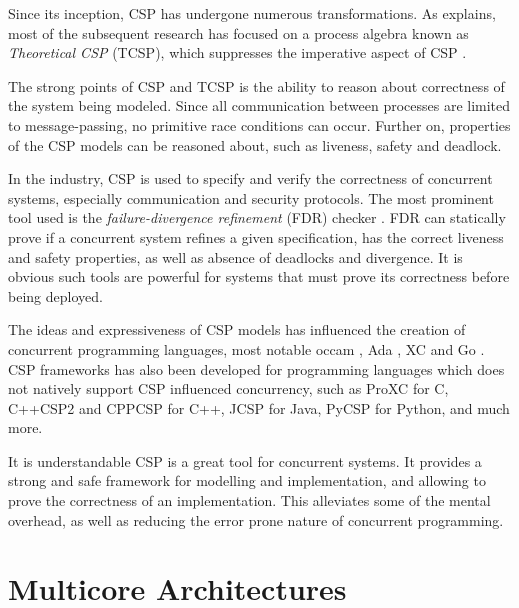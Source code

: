 Since its inception, CSP has undergone numerous transformations. As \citet{abdallah2005communicating} explains, most of the subsequent research has focused on a process algebra known as \textit{Theoretical CSP} (TCSP), which suppresses the imperative aspect of CSP \citep{brookes1984theory}. 

The strong points of CSP and TCSP is the ability to reason about correctness of the system being modeled. Since all communication between processes are limited to message\hyp{}passing, no primitive race conditions can occur. Further on, properties of the CSP models can be reasoned about, such as liveness, safety and deadlock. 

In the industry, CSP is used to specify and verify the correctness of concurrent systems, especially communication and security protocols. The most prominent tool used is the \textit{failure\hyp{}divergence refinement} (FDR) checker \citep{manual2000failures}. FDR can statically prove if a concurrent system refines a given specification, has the correct liveness and safety properties, as well as absence of deadlocks and divergence. It is obvious such tools are powerful for systems that must prove its correctness before being deployed.

The ideas and expressiveness of CSP models has influenced the creation of concurrent programming languages, most notable occam \citep{inmos1988occam}, Ada \citep{ledgard1983reference}, XC \citep{douglas2009programming} and Go \citep{go2009go}. CSP frameworks has also been developed for programming languages which does not natively support CSP influenced concurrency, such as ProXC \citep{pettersen2016proxc} for C, C++CSP2 \citep{brown2007c++csp2} and CPPCSP \citep{chalmers2016cppcsp} for C++, JCSP \citep{welch2007jcsp} for Java, PyCSP \citep{bjorndalen2007pycsp} for Python, and much more.

It is understandable CSP is a great tool for concurrent systems. It provides a strong and safe framework for modelling and implementation, and allowing to prove the correctness of an implementation. This alleviates some of the mental overhead, as well as reducing the error prone nature of concurrent programming. 


\section{Multicore Architectures}
\label{sec:multicore_architectures}




